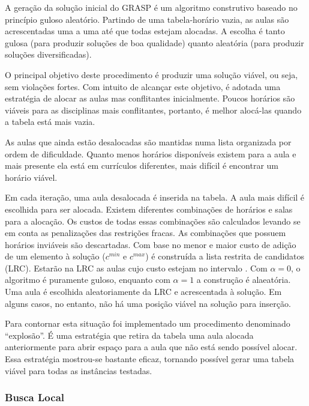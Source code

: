 \documentclass[11pt]{article}
\begin{document}
A geração da solução inicial do GRASP é um algoritmo construtivo baseado no princípio guloso aleatório. Partindo de uma tabela-horário vazia, as aulas são acrescentadas uma a uma até que todas estejam alocadas. A escolha é tanto gulosa (para produzir soluções de boa qualidade) quanto aleatória (para produzir soluções diversificadas).

O principal objetivo deste procedimento é produzir uma solução viável, ou seja, sem violações fortes. Com intuito de alcançar este objetivo, é adotada uma estratégia de alocar as aulas mas conflitantes inicialmente. Poucos horários são viáveis para as disciplinas mais conflitantes, portanto, é melhor alocá-las quando a tabela está mais vazia.

As aulas que ainda estão desalocadas são mantidas numa lista organizada por ordem de dificuldade. Quanto menos horários disponíveis existem para a aula e mais presente ela está em currículos diferentes, mais difícil é encontrar um horário viável.

Em cada iteração, uma aula desalocada é inserida na tabela. A aula mais difícil é escolhida para ser alocada. Existem diferentes combinações de horários e salas para a alocação. Os custos de todas essas combinações são calculados levando se em conta as penalizações das restrições fracas. As combinações que possuem horários inviáveis são descartadas. Com base no menor e maior custo de adição de um elemento à solução ($c^{min}$ e $c^{max}$) é construída a lista restrita de candidatos (LRC). Estarão na LRC as aulas cujo custo estejam no intervalo \begin{math} [c^{min}, c^{min}+\alpha(c^{max} - c^{min})]\end{math}. Com $\alpha=0$, o algoritmo é puramente guloso, enquanto com $\alpha=1$ a construção é alaeatória. Uma aula é escolhida aleatoriamente da LRC e acrescentada à solução. Em alguns casos, no entanto, não há uma posição viável na solução para inserção. 

Para contornar esta situação foi implementado um procedimento denominado “explosão”. É uma estratégia que retira da tabela uma aula alocada anteriormente para abrir espaço para a aula que não está sendo possível alocar. Essa estratégia mostrou-se bastante eficaz, tornando possível gerar uma tabela viável para todas as instâncias testadas.

\subsubsection{Busca Local}
\end{document}
